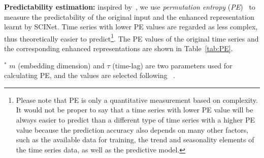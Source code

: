 \documentclass{article}
\begin{document}
\vspace{3pt}
\textbf{Predictability estimation:} inspired by~\citep{Huang2019EnhancedTS,Pennekamp2019TheIP}, we use \textit{permutation entropy} (\textit{PE})~\citep{Bandt2002PermutationEA} to measure the predictability of the original input and the enhanced representation learnt by SCINet. Time series with lower PE values are regarded as less complex, thus theoretically easier to predict\footnote{Please note that PE is only a quantitative measurement based on complexity. It would not be proper to say that a time series with lower PE value will be always easier to predict than a different type of time series with a higher PE value because the prediction accuracy also depends on many other factors, such as the available data for training, the trend and seasonality elements of the time series data, as well as the predictive model.}. The PE values of the original time series and the corresponding enhanced representations are shown in Table~\ref{tab:PE}.  

\begin{table*}[h]
\caption{Permutation entropy comparison before and after SCINet.}
\begin{threeparttable}
\begin{tablenotes} \tiny
		\item  $^*$ $m$ (embedding dimension) and $\tau$ (time-lag) are two parameters used for calculating PE, and the values are selected following ~\citep{Pennekamp2019TheIP,Huang2019EnhancedTS}.
     \end{tablenotes} 

\end{threeparttable} \label{tab:PE}
\end{table*}
\end{document}
